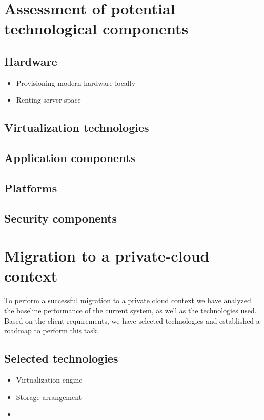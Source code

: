 \documentclass{llncs}
\begin{document}
\section{Assessment of potential technological components}

\subsection{Hardware}

\begin{itemize}
  \item Provisioning modern hardware locally
  \item Renting server space
\end{itemize}

\subsection{Virtualization technologies}


\subsection{Application components}

\subsection{Platforms}

\subsection{Security components}


\section{Migration to a private-cloud context}

To perform a successful migration to a private cloud context we have analyzed the baseline performance of the current system, as well as the technologies used. Based on the client requirements, we have selected technologies and established a roadmap to perform this task.   

\subsection{Selected technologies}

\begin{itemize}
  \item Virtualization engine
  \item Storage arrangement
  \item 
\end{itemize}
\end{document}
